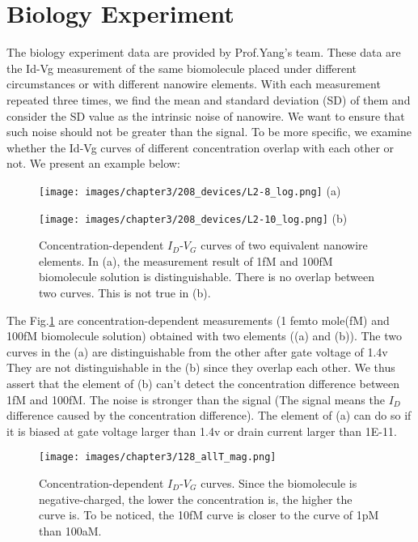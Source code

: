 \section{Biology Experiment}
The biology experiment data are provided by Prof.Yang's team.
These data are the Id-Vg measurement of the same biomolecule placed under different circumstances or with different nanowire elements.
With each measurement repeated three times, we find the mean and standard deviation (SD) of them and consider the SD value as the intrinsic noise of nanowire.
We want to ensure that such noise should not be greater than the signal.
To be more specific, we examine whether the Id-Vg curves of different concentration overlap with each other or not.
We present an example below:
\begin{figure}[!htbp]
    \centering
    \begin{minipage}[t]{0.4\textwidth}
        \centering
        \texttt{[image: images/chapter3/208\_devices/L2-8\_log.png]}
        (a)
    \end{minipage}
    \hfill
    \begin{minipage}[t]{0.4\textwidth}
        \centering
        \texttt{[image: images/chapter3/208\_devices/L2-10\_log.png]}
        (b)
    \end{minipage}
    \caption{Concentration-dependent $I_D$-$V_G$ curves of two equivalent nanowire elements.
    In (a), the measurement result of 1fM and 100fM biomolecule solution is distinguishable. There is no overlap between two curves. This is not true in (b).}
    \label{fig:SD_sucandfail}
\end{figure}

The Fig.\ref{fig:SD_sucandfail} are concentration-dependent measurements (1 femto mole(fM) and 100fM biomolecule solution) obtained with two elements ((a) and (b)).
The two curves in the (a) are distinguishable from the other after gate voltage of 1.4v
They are not distinguishable in the (b) since they overlap each other.
We thus assert that the element of (b) can't detect the concentration difference between 1fM and 100fM.
The noise is stronger than the signal (The signal means the $I_D$ difference caused by the concentration difference).
The element of (a) can do so if it is biased at gate voltage larger than 1.4v or drain current larger than 1E-11.

\begin{figure}[!htbp]
        \texttt{[image: images/chapter3/128\_allT\_mag.png]}
    \caption{Concentration-dependent $I_D$-$V_G$ curves.
    Since the biomolecule is negative-charged, the lower the concentration is, the higher the curve is.
    To be noticed, the 10fM curve is closer to the curve of 1pM than 100aM.
     }
    \label{fig:SD_allT}
\end{figure}

